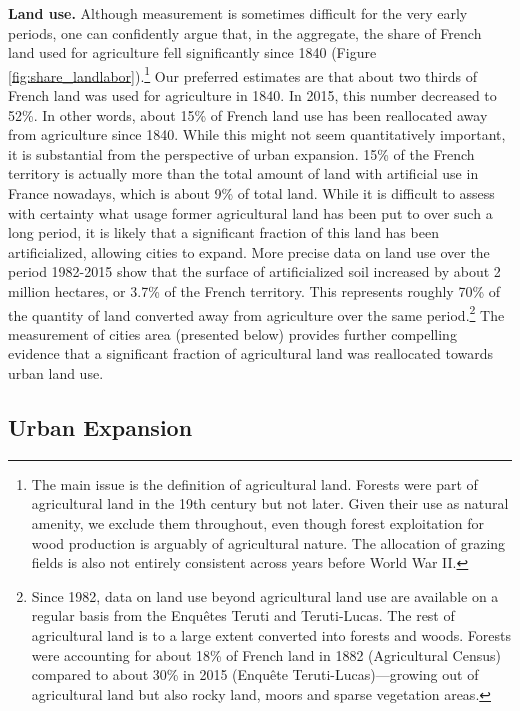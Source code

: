 \documentclass[./20250130-paper.tex]{subfiles}
\begin{document}
\textbf{Land use.} Although measurement is sometimes difficult for the very early periods, one can confidently argue that, in the aggregate, the share of French land used for agriculture  fell significantly since 1840 (Figure \ref{fig:share_landlabor}).\footnote{The main issue is the definition of agricultural land. Forests were part of agricultural land in the 19th century but not later. Given their use as natural amenity, we exclude them throughout, even though forest exploitation for wood production is arguably of agricultural nature. The allocation of grazing fields is also not entirely consistent across years before World War II.} Our preferred estimates are that about two thirds of French land was used for agriculture in 1840. In 2015, this number decreased to 52\%. In other words, about 15\% of French land use has been reallocated away from agriculture since 1840. While this might not seem quantitatively important, it is substantial from the perspective of urban expansion. 15\% of the French territory is actually more than the total amount of land with artificial use in France nowadays, which is about 9\% of total land. While it is difficult to assess with certainty what usage former agricultural land has been put to over such a long period, it is likely that a significant fraction of this land has been artificialized, allowing cities to expand. More precise data on land use over the period 1982-2015 show that the surface of artificialized soil increased by about 2 million hectares, or 3.7\% of the French territory. This represents roughly 70\% of the quantity of land converted away from agriculture over the same period.\footnote{Since 1982, data on land use beyond agricultural land use are available on a regular basis from the Enquêtes Teruti and Teruti-Lucas. The rest of agricultural land is to a large extent converted into forests and woods. Forests were accounting for about 18\% of French land in 1882 (Agricultural Census) compared to about 30\% in 2015 (Enquête Teruti-Lucas)---growing out of agricultural land but also rocky land, moors and sparse vegetation areas.} The measurement of cities area (presented below) provides further compelling evidence that a significant fraction of agricultural land was reallocated towards urban land use.


\subsection{Urban Expansion}\label{sec:urban-expansion}
\end{document}
